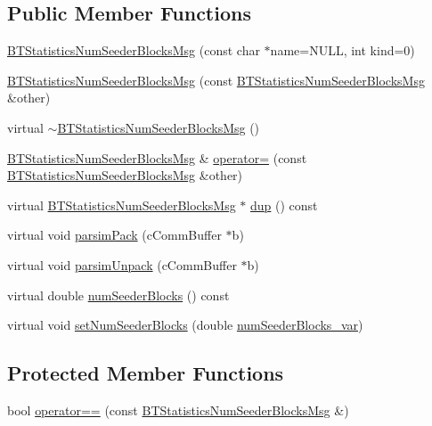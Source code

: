 \subsection*{Public Member Functions}
\begin{DoxyCompactItemize}
\item 
\hyperlink{classBTStatisticsNumSeederBlocksMsg_a5d2af03243461bb5b98846d2c522ad66}{B\+T\+Statistics\+Num\+Seeder\+Blocks\+Msg} (const char $\ast$name=N\+U\+L\+L, int kind=0)
\item 
\hyperlink{classBTStatisticsNumSeederBlocksMsg_a529b5bd96bb11e7e88771902aef0cfbc}{B\+T\+Statistics\+Num\+Seeder\+Blocks\+Msg} (const \hyperlink{classBTStatisticsNumSeederBlocksMsg}{B\+T\+Statistics\+Num\+Seeder\+Blocks\+Msg} \&other)
\item 
virtual \hyperlink{classBTStatisticsNumSeederBlocksMsg_ab3c47ce19884582b74479978f0127c5e}{$\sim$\+B\+T\+Statistics\+Num\+Seeder\+Blocks\+Msg} ()
\item 
\hyperlink{classBTStatisticsNumSeederBlocksMsg}{B\+T\+Statistics\+Num\+Seeder\+Blocks\+Msg} \& \hyperlink{classBTStatisticsNumSeederBlocksMsg_a9b079f428f2992996abdd7f8d9efe0aa}{operator=} (const \hyperlink{classBTStatisticsNumSeederBlocksMsg}{B\+T\+Statistics\+Num\+Seeder\+Blocks\+Msg} \&other)
\item 
virtual \hyperlink{classBTStatisticsNumSeederBlocksMsg}{B\+T\+Statistics\+Num\+Seeder\+Blocks\+Msg} $\ast$ \hyperlink{classBTStatisticsNumSeederBlocksMsg_a44044a4c7f90c3efba1bef8718f1e4ff}{dup} () const 
\item 
virtual void \hyperlink{classBTStatisticsNumSeederBlocksMsg_a88a03ef916580cf6444af39b99ddf5ed}{parsim\+Pack} (c\+Comm\+Buffer $\ast$b)
\item 
virtual void \hyperlink{classBTStatisticsNumSeederBlocksMsg_a84b8cc5dbc283c4b78c8690bb132c2a3}{parsim\+Unpack} (c\+Comm\+Buffer $\ast$b)
\item 
virtual double \hyperlink{classBTStatisticsNumSeederBlocksMsg_a3cc398947135cbcc744dff2f3b3a8acc}{num\+Seeder\+Blocks} () const 
\item 
virtual void \hyperlink{classBTStatisticsNumSeederBlocksMsg_a22e498f7170b1cee325e3bfccf90d512}{set\+Num\+Seeder\+Blocks} (double \hyperlink{classBTStatisticsNumSeederBlocksMsg_a58db53e8c0c42406ba090ecc6bc0cd11}{num\+Seeder\+Blocks\+\_\+var})
\end{DoxyCompactItemize}
\subsection*{Protected Member Functions}
\begin{DoxyCompactItemize}
\item 
bool \hyperlink{classBTStatisticsNumSeederBlocksMsg_afdff1f716ba69718851cc1a2c4bd731a}{operator==} (const \hyperlink{classBTStatisticsNumSeederBlocksMsg}{B\+T\+Statistics\+Num\+Seeder\+Blocks\+Msg} \&)
\end{DoxyCompactItemize}
